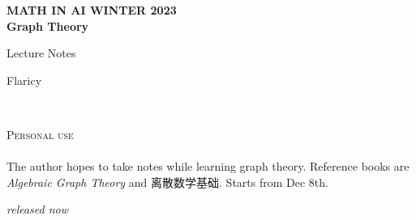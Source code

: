 \documentclass[11pt,fleqn]{book} %
\begin{document}
\begin{CJK}{UTF8}{gkai} %

\begingroup
\thispagestyle{empty}
\centering
\vspace*{5cm}
\par\normalfont\fontsize{35}{35}\sffamily\selectfont
\textbf{MATH IN AI WINTER 2023}\\
\vspace*{0.4cm}
{\Huge \textbf{Graph Theory}}\par %
\vspace*{0.4cm}
{\Huge Lecture Notes}\par %
{\Large Flaricy}\par
\endgroup


\newpage
~\vfill
\thispagestyle{empty}


\noindent \textsc{Personal use}\\

\\ %

\noindent The author hopes to take notes while learning graph theory. Reference books are \textit{Algebraic Graph Theory} and 离散数学基础. Starts from Dec 8th. 

\noindent \textit{released now} %



\pagestyle{empty} %

\tableofcontents %


\end{CJK}
\end{document}
